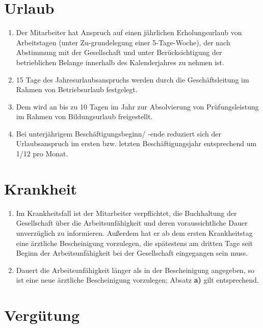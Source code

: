 \documentclass[twoside,a4paper]{scrreprt}
\begin{document}
\section{Urlaub}
    
    \centerline{ }
    \begin{enumerate}[label=(\alph*)]
    	\item Der Mitarbeiter hat Anspruch auf einen jährlichen Erholungsurlaub von \Urlaub \white Arbeitstagen (unter Zu-grundelegung einer 5-Tage-Woche), der nach Abstimmung mit der Gesellschaft und unter Berücksichtigung der betrieblichen Belange innerhalb des Kalenderjahres zu nehmen ist.
    	\item 15 Tage des Jahresurlaubsanspruchs werden durch die Geschäftsleitung im Rahmen von Betriebsurlaub festgelegt.
    	\item Dem wird an bis zu 10 Tagen im Jahr zur Absolvierung von Prüfungsleistung im Rahmen von Bildungsurlaub freigestellt.
    	\item Bei unterjährigem Beschäftigungsbeginn/ -ende reduziert sich der Urlaubsanspruch im ersten bzw. letzten Beschäftigungsjahr entsprechend um 1/12 pro Monat.
    \end{enumerate}

\section{Krankheit}
    
    \centerline{ }
    \begin{enumerate}[label=(\alph*)]
    	\item Im Krankheitsfall ist der Mitarbeiter verpflichtet, die Buchhaltung der Gesellschaft über die Arbeitsunfähigkeit und deren voraussichtliche Dauer unverzüglich zu informieren. Außerdem hat er ab dem ersten Krankheitstag eine ärztliche Bescheinigung vorzulegen, die spätestens am dritten Tage seit Beginn der Arbeitsunfähigkeit bei der Gesellschaft eingegangen sein muss.
    	\item Dauert die Arbeitsunfähigkeit länger als in der Bescheinigung angegeben, so ist eine neue ärztliche Bescheinigung vorzulegen; Absatz \textbf{a)} gilt entsprechend.
    \end{enumerate}

\newpage    
\section{Vergütung}
\end{document}
